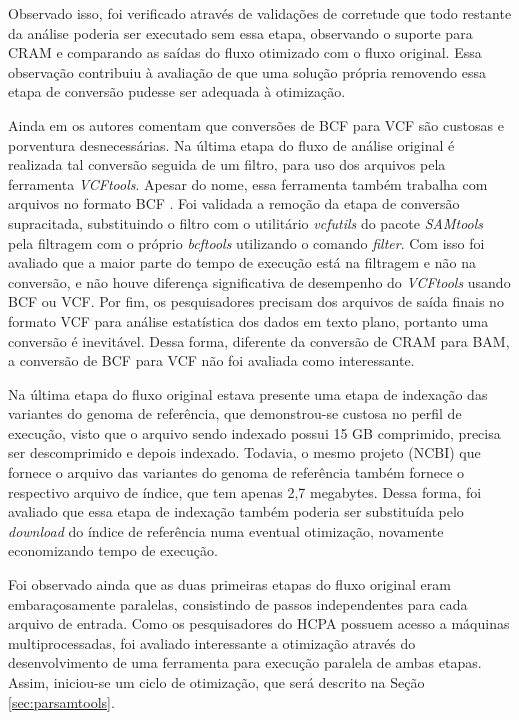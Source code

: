 \documentclass[cic,tc]{iiufrgs}
\begin{document}
Observado isso, foi verificado através de validações de corretude que todo
restante da análise poderia ser executado sem essa etapa, observando o suporte
para CRAM e comparando as saídas do fluxo otimizado com o fluxo original. Essa
observação contribuiu à avaliação de que uma solução própria removendo essa
etapa de conversão pudesse ser adequada à otimização.

Ainda em \cite{danecek2021twelve} os autores comentam que conversões de BCF
para VCF são custosas e porventura desnecessárias. Na última etapa do fluxo de
análise original é realizada tal conversão seguida de um filtro, para uso dos
arquivos pela ferramenta \textit{VCFtools}. Apesar do nome, essa ferramenta também
trabalha com arquivos no formato BCF \cite{man2015vcftools}. Foi validada a
remoção da etapa de conversão supracitada, substituindo o filtro com o
utilitário \textit{vcfutils} do pacote \textit{SAMtools} pela filtragem com o próprio
\textit{bcftools} utilizando o comando \textit{filter}. Com isso foi avaliado que a
maior parte do tempo de execução está na filtragem e não na conversão, e não
houve diferença significativa de desempenho do \textit{VCFtools} usando BCF ou VCF. Por
fim, os pesquisadores precisam dos arquivos de saída finais no formato VCF para
análise estatística dos dados em texto plano, portanto uma conversão é
inevitável. Dessa forma, diferente da conversão de CRAM para BAM, a conversão
de BCF para VCF não foi avaliada como interessante.

Na última etapa do fluxo original estava presente uma etapa de indexação das
variantes do genoma de referência, que demonstrou-se custosa no perfil de
execução, visto que o arquivo sendo indexado possui 15 GB comprimido, precisa
ser descomprimido e depois indexado. Todavia, o mesmo projeto (NCBI) que
fornece o arquivo das variantes do genoma de referência também fornece o
respectivo arquivo de índice, que tem apenas 2,7 megabytes. Dessa forma, foi
avaliado que essa etapa de indexação também poderia ser substituída pelo
\textit{download} do índice de referência numa eventual otimização, novamente
economizando tempo de execução.

Foi observado ainda que as duas primeiras etapas do fluxo original eram
embaraçosamente paralelas, consistindo de passos independentes para cada
arquivo de entrada. Como os pesquisadores do HCPA possuem acesso a máquinas
multiprocessadas, foi avaliado interessante a otimização através do
desenvolvimento de uma ferramenta para execução paralela de ambas etapas.
Assim, iniciou-se um ciclo de otimização, que será descrito na Seção
\ref{sec:parsamtools}.
\end{document}
